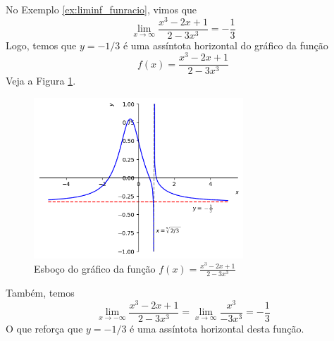 \cleardoublepage\documentclass[../main.tex]{subfiles}
\begin{document}
\begin{ex}\label{ex:ass_hor}
  No Exemplo \ref{ex:liminf_funracio}, vimos que
  \begin{equation*}
    \lim_{x\to\infty} \frac{x^3 - 2x + 1}{2 - 3x^3} = -\frac{1}{3}
  \end{equation*}
  Logo, temos que $y=-1/3$ é uma assíntota horizontal do gráfico da função
  \begin{equation*}
    f(x) = \frac{x^3 - 2x + 1}{2 - 3x^3}
  \end{equation*}
  Veja a Figura \ref{fig:ex_ass_horizon}.

      \begin{figure}[htb]
      \centering
      \includegraphics[width=0.7\textwidth]{fig_lim/fig_ex_ass_horizon}
      \caption{Esboço do gráfico da função $\displaystyle f(x) = \frac{x^3 - 2x + 1}{2 - 3x^3}$}
      \label{fig:ex_ass_horizon}
    \end{figure}

  Também, temos
  \begin{equation*}
    \lim_{x\to -\infty} \frac{x^3 - 2x + 1}{2 - 3x^3} = \lim_{x\to\infty} \frac{x^3}{-3x^3} = -\frac{1}{3}
  \end{equation*}
  O que reforça que $y = -1/3$ é uma assíntota horizontal desta função.
\end{ex}
\end{document}
